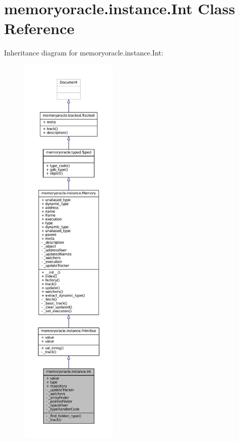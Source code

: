 \hypertarget{classmemoryoracle_1_1instance_1_1Int}{}\section{memoryoracle.\+instance.\+Int Class Reference}
\label{classmemoryoracle_1_1instance_1_1Int}


Inheritance diagram for memoryoracle.\+instance.\+Int\+:
\nopagebreak
\begin{figure}[H]
\begin{center}
\leavevmode
\includegraphics[height=550pt]{classmemoryoracle_1_1instance_1_1Int__inherit__graph}
\end{center}
\end{figure}


